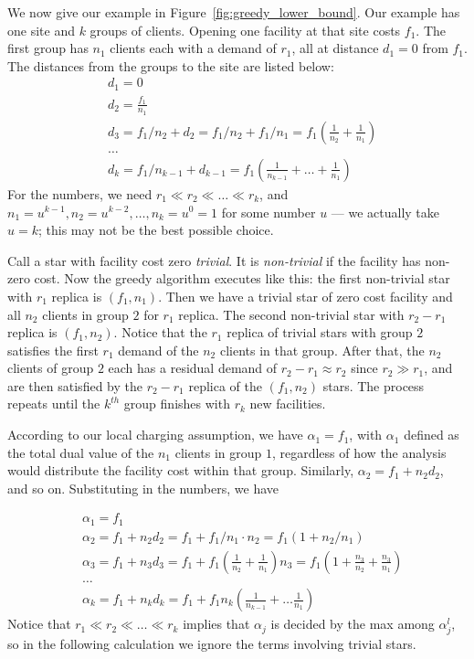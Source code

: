 \documentclass[oneside,final]{ucr}
\begin{document}
We now give our example in
Figure~\ref{fig:greedy_lower_bound}. Our example has one
site and $k$ groups of clients. Opening one facility at that
site costs $f_1$. The first group has $n_1$ clients each
with a demand of $r_1$, all at distance $d_1 = 0$ from
$f_1$. The distances from the groups to the site are listed
below:
\begin{align*}
  &d_1 = 0\\
  &d_2 = \frac{f_1}{n_1}\\
  &d_3 = f_1/n_2 + d_2 = f_1/n_2 + f_1/n_1 = f_1 (\frac{1}{n_2} + \frac{1}{n_1})\\
  &\ldots\\
  &d_k = f_1/n_{k-1} + d_{k-1} = f_1 (\frac{1}{n_{k-1}} + \ldots + \frac{1}{n_1})
\end{align*}
For the numbers, we need $r_1 \ll r_2 \ll \ldots \ll r_k$,
and $n_1 = u^{k-1}, n_2 = u^{k-2}, \ldots, n_k = u^0 = 1$
for some number $u$ --- we actually take $u=k$; this may not
be the best possible choice.

Call a star with facility cost zero \emph{trivial}. It is
\emph{non-trivial} if the facility has non-zero cost. Now
the greedy algorithm executes like this: the first
non-trivial star with $r_1$ replica is $(f_1, n_1)$. Then we
have a trivial star of zero cost facility and all $n_2$
clients in group $2$ for $r_1$ replica. The second
non-trivial star with $r_2 - r_1$ replica is $(f_1,
n_2)$. Notice that the $r_1$ replica of trivial stars with
group $2$ satisfies the first $r_1$ demand of the $n_2$
clients in that group. After that, the $n_2$ clients of
group $2$ each has a residual demand of $r_2 - r_1 \approx
r_2$ since $r_2 \gg r_1$, and are then satisfied by the $r_2
- r_1$ replica of the $(f_1, n_2)$ stars. The process
repeats until the $k^{th}$ group finishes with $r_k$ new
facilities.

According to our local charging assumption, we have
$\alpha_1 = f_1$, with $\alpha_1$ defined as the total dual
value of the $n_1$ clients in group $1$, regardless of how
the analysis would distribute the facility cost within that
group. Similarly, $\alpha_2 = f_1 + n_2 d_2$, and so
on. Substituting in the numbers, we have

\begin{align*}
  &\alpha_1 = f_1\\
  &\alpha_2 = f_1 + n_2 d_2 = f_1 + f_1/n_1\cdot n_2 = f_1 (1 + n_2 /
  n_1)\\
  &\alpha_3 = f_1 + n_3 d_3 = f_1 + f_1 (\frac{1}{n_2} +
  \frac{1}{n_1}) n_3 = f_1 (1 + \frac{n_3}{n_2} + \frac{n_3}{n_1})\\
  &\ldots\\
  &\alpha_k = f_1 + n_k d_k = f_1 + f_1 n_k (\frac{1}{n_{k-1}} + \ldots
  \frac{1}{n_1})
\end{align*}
Notice that $r_1 \ll r_2 \ll \ldots \ll r_k$ implies that
$\alpha_j$ is decided by the max among $\alpha_j^l$, so in
the following calculation we ignore the terms involving
trivial stars.
\end{document}
